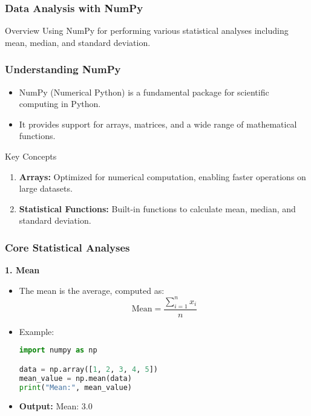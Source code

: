 \documentclass[aspectratio=169]{beamer}
\begin{document}
\begin{frame}
    \frametitle{Data Analysis with NumPy}
    \begin{block}{Overview}
        Using NumPy for performing various statistical analyses including mean, median, and standard deviation.
    \end{block}
\end{frame}

\begin{frame}
    \frametitle{Understanding NumPy}
    \begin{itemize}
        \item NumPy (Numerical Python) is a fundamental package for scientific computing in Python.
        \item It provides support for arrays, matrices, and a wide range of mathematical functions.
    \end{itemize}
    \begin{block}{Key Concepts}
        \begin{enumerate}
            \item \textbf{Arrays:} Optimized for numerical computation, enabling faster operations on large datasets.
            \item \textbf{Statistical Functions:} Built-in functions to calculate mean, median, and standard deviation.
        \end{enumerate}
    \end{block}
\end{frame}

\begin{frame}
    \frametitle{Core Statistical Analyses}
    \textbf{1. Mean}
    \begin{itemize}
        \item The mean is the average, computed as:
        \begin{equation}
            \text{Mean} = \frac{\sum_{i=1}^{n} x_i}{n}
        \end{equation}
        \item Example:
        \begin{lstlisting}[language=Python]
import numpy as np

data = np.array([1, 2, 3, 4, 5])
mean_value = np.mean(data)
print("Mean:", mean_value)
        \end{lstlisting}
        \item \textbf{Output:} Mean: 3.0
    \end{itemize}
\end{frame}
\end{document}
